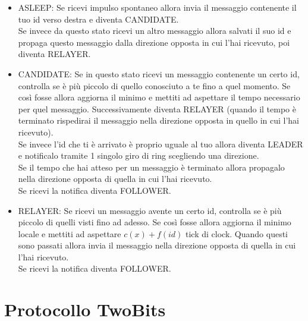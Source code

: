  \begin{itemize}
     \item ASLEEP: Se ricevi impulso spontaneo allora invia il messaggio contenente il tuo id verso destra e diventa CANDIDATE.\\
     Se invece da questo stato ricevi un altro messaggio allora salvati il suo id e propaga questo messaggio dalla direzione opposta in cui l'hai ricevuto, poi diventa RELAYER.
     \item CANDIDATE: Se in questo stato ricevi un messaggio contenente un certo id, controlla se è più piccolo di quello conosciuto a te fino a quel momento. Se così fosse allora aggiorna il minimo e mettiti ad aspettare il tempo necessario per quel messaggio. Successivamente diventa RELAYER (quando il tempo è terminato rispedirai il messaggio nella direzione opposta in quello in cui l'hai ricevuto).\\
     Se invece l'id che ti è arrivato è proprio uguale al tuo allora diventa LEADER e notificalo tramite 1 singolo giro di ring scegliendo una direzione.\\
     Se il tempo che hai atteso per un messaggio è terminato allora propagalo nella direzione opposta di quella in cui l'hai ricevuto.\\
     Se ricevi la notifica diventa FOLLOWER.
     \item RELAYER: Se ricevi un messaggio avente un certo id, controlla se è più piccolo di quelli visti fino ad adesso. Se così fosse allora aggiorna il minimo locale e mettiti ad aspettare $c(x)+f(id)$ tick di clock. Quando questi sono passati allora invia il messaggio nella direzione opposta di quella in cui l'hai ricevuto.\\
     Se ricevi la notifica diventa FOLLOWER.
     
 \end{itemize}
 
\section{Protocollo TwoBits}

